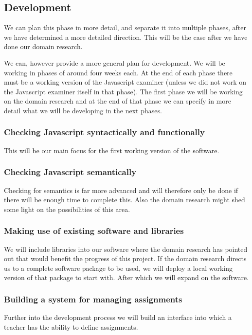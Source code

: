\documentclass{article}
\begin{document}
\subsection{Development}
We can plan this phase in more detail, and separate it into multiple phases, after we have determined a more detailed direction. This will be the case after we have done our domain research.

We can, however provide a more general plan for development. We will be working in phases of around four weeks each. At the end of each phase there must be a working version of the Javascript examiner (unless we did not work on the Javascript examiner itself in that phase). The first phase we will be working on the domain research and at the end of that phase we can specify in more detail what we will be developing in the next phases.

\subsubsection{Checking Javascript syntactically and functionally}
This will be our main focus for the first working version of the software.
\subsubsection{Checking Javascript semantically}
Checking for semantics is far more advanced and will therefore only be done if there will be enough time to complete this. Also the domain research might shed some light on the possibilities of this area.
\subsubsection{Making use of existing software and libraries}
We will include libraries into our software where the domain research has pointed out that would benefit the progress of this project. If the domain research directs us to a complete software package to be used, we will deploy a local working version of that package to start with. After which we will expand on the software.
\subsubsection{Building a system for managing assignments}
Further into the development process we will build an interface into which a teacher has the ability to define assignments.
\end{document}
